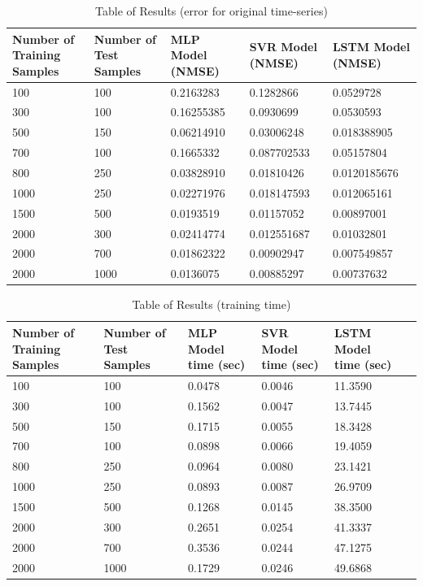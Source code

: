 \documentclass{article}
\begin{document}
\begin{table}[ht]
	\centering
	\begin{tabular}{p{2cm} p{2cm} p{2cm} p{2cm} p{2cm}}
		\toprule
		Number of Training Samples & Number of Test Samples & MLP Model (NMSE) & SVR Model (NMSE) & LSTM Model (NMSE) \\
		\midrule
		100 & 100 & 0.2163283 & 0.1282866 & 0.0529728 \\
		\midrule
		300 & 100 & 0.16255385 & 0.0930699 & 0.0530593 \\ 
		\midrule
		500 & 150 & 0.06214910 & 0.03006248 & 0.018388905 \\
		\midrule
		700 & 100 & 0.1665332 & 0.087702533 & 0.05157804 \\
		\midrule
		800 & 250 & 0.03828910 & 0.01810426 & 0.0120185676 \\
		\midrule
		1000 & 250 & 0.02271976  & 0.018147593 & 0.012065161 \\
		\midrule
		1500 & 500 & 0.0193519 & 0.01157052 & 0.00897001 \\
		\midrule
		2000 & 300 & 0.02414774 & 0.012551687 & 0.01032801 \\
		\midrule
		2000 & 700 & 0.01862322 &  0.00902947 & 0.007549857 \\
		\midrule
		2000 & 1000 & 0.0136075 & 0.00885297 & 0.00737632 \\
		\bottomrule
	\end{tabular} \caption{Table of Results (error for original time-series)}
\end{table}

\begin{table}[ht]
	\centering
	\begin{tabular}{p{2cm} p{2cm} p{2cm} p{2cm} p{2cm} p{2cm}}
		\toprule
		Number of Training Samples & Number of Test Samples & MLP Model time (sec) & SVR Model time (sec) & LSTM Model time (sec) \\
		\midrule
		100 & 100 & 0.0478 & 0.0046 & 11.3590 \\
		\midrule
		300 & 100 & 0.1562 & 0.0047 & 13.7445 \\
		\midrule
		500 & 150 & 0.1715 & 0.0055 & 18.3428 \\
		\midrule
		700 & 100 & 0.0898 & 0.0066 & 19.4059 \\
		\midrule
		800 & 250 & 0.0964 & 0.0080 & 23.1421 \\
		\midrule
		1000 & 250 & 0.0893 & 0.0087 & 26.9709 \\
		\midrule
		1500 & 500 & 0.1268 & 0.0145 & 38.3500 \\
		\midrule
		2000 & 300 & 0.2651 & 0.0254 & 41.3337 \\
		\midrule
		2000 & 700 & 0.3536 & 0.0244 & 47.1275 \\
		\midrule
		2000 & 1000 & 0.1729 & 0.0246 & 49.6868 \\
		\bottomrule
	\end{tabular}
	\caption{Table of Results (training time)}
\end{table}
\end{document}
